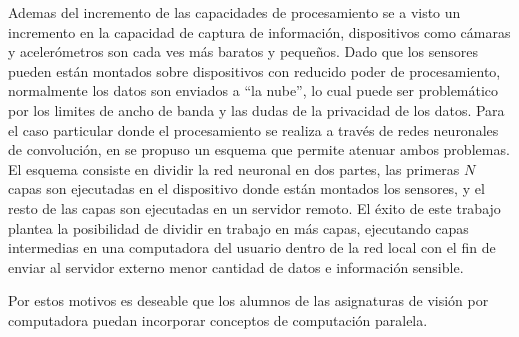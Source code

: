 Ademas del incremento de las capacidades de procesamiento se a visto un
incremento en la capacidad de captura de información, dispositivos como cámaras
y acelerómetros son cada ves más baratos y pequeños. Dado que los sensores
pueden están montados sobre dispositivos con reducido poder de procesamiento,
normalmente los datos son enviados a ``la nube'', lo cual puede ser problemático
por los limites de ancho de banda y las dudas de la privacidad de los datos.
Para el caso particular donde el procesamiento se realiza a través de redes
neuronales de convolución, en \cite{pipelinebasedCaffe2017} se propuso un
esquema que permite atenuar ambos problemas. El esquema consiste en dividir la
red neuronal en dos partes, las primeras $N$ capas son ejecutadas en el
dispositivo donde están montados los sensores, y el resto de las capas son
ejecutadas en un servidor remoto. El éxito de este trabajo plantea la
posibilidad de dividir en trabajo en más capas, ejecutando capas intermedias en
una computadora del usuario dentro de la red local con el fin de enviar al
servidor externo menor cantidad de datos e información sensible.

Por estos motivos es deseable que los alumnos de las asignaturas de visión por
computadora puedan incorporar conceptos de computación paralela.

